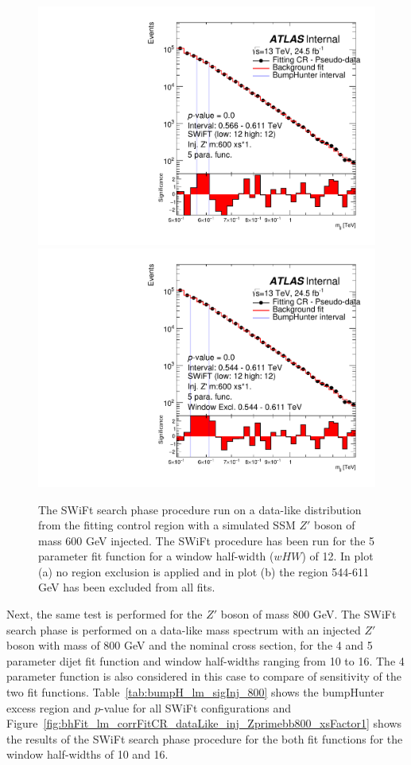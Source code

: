 \begin{figure}[!htb]
\captionsetup[subfigure]{aboveskip=0pt,justification=centering}
\centering
{} {
  \includegraphics[width=0.45\linewidth, angle=0]{figs/Dibjet/LowMass/FitStudy/bhFit_corrFitCR_dataLike_v13_5para_low12_high12_inj_Zprimebb600_xsFactor1.pdf}
}
 {
  \includegraphics[width=0.45\linewidth, angle=0]{figs/Dibjet/LowMass/FitStudy/bhFit_corrFitCR_dataLike_v13_5para_low12_high12_inj_Zprimebb600_xsFactor1_removedWindow.pdf}
}
\caption{  The SWiFt search phase procedure run on a data-like distribution
  from the fitting control region with a simulated SSM $Z'$ boson of mass 600 GeV injected.
  The SWiFt procedure has been run for the 5 parameter fit function for a window half-width ($wHW$) of 12.
  In plot (a) no region exclusion is applied and in plot (b) the region 544-611 GeV has been excluded from all fits.
  \label{fig:bhFit_lm_corrFitCR_dataLike_inj_Zprimebb600_xsFactor1}
}
\end{figure}


\FloatBarrier

Next, the same test is performed for the $Z'$ boson of mass 800 GeV.
The  SWiFt search phase is performed on a data-like mass spectrum
with an injected $Z'$ boson with mass of 800 GeV and the nominal cross section,
for the 4 and 5 parameter dijet fit function and window half-widths ranging from 10 to 16.
The 4 parameter function is also considered in this case to compare of sensitivity of the two fit functions.
Table~\ref{tab:bumpH_lm_sigInj_800} shows the bumpHunter excess region and \mbox{$p$-value} for all SWiFt configurations
and Figure~\ref{fig:bhFit_lm_corrFitCR_dataLike_inj_Zprimebb800_xsFactor1}  shows the results of the SWiFt search phase procedure
for the both fit functions for the window half-widths of 10 and 16.

